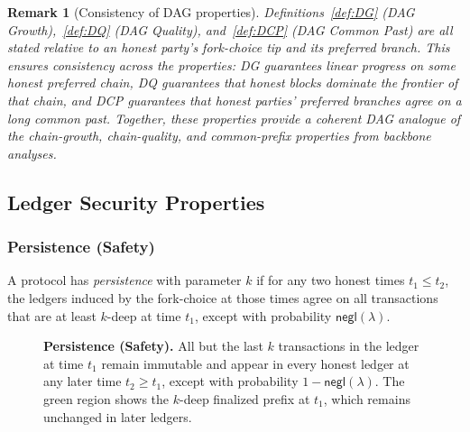 \documentclass[11pt]{article}
\newtheorem{remark}[theorem]{Remark}
\newcommand{\negl}{\ensuremath{\mathsf{negl}}\xspace}
\begin{document}
\begin{remark}[Consistency of DAG properties]
Definitions~\ref{def:DG} (DAG Growth),~\ref{def:DQ} (DAG Quality), and~\ref{def:DCP} (DAG Common Past) are all stated relative to an honest party’s fork-choice tip and its preferred branch. This ensures consistency across the properties: \emph{DG} guarantees linear progress on some honest preferred chain, \emph{DQ} guarantees that honest blocks dominate the frontier of that chain, and \emph{DCP} guarantees that honest parties’ preferred branches agree on a long common past. Together, these properties provide a coherent DAG analogue of the chain-growth, chain-quality, and common-prefix properties from backbone analyses.
\end{remark}



\newpage
\subsection{Ledger Security Properties}

\subsubsection{Persistence (Safety)}
A protocol has \emph{persistence} with parameter $k$ if for any two honest times $t_1\le t_2$,
the ledgers induced by the fork-choice at those times agree on all transactions that are at least $k$-deep at time $t_1$,
except with probability $\negl(\lambda)$.


\begin{figure}[htp!]
\centering
{}
\caption{\textbf{Persistence (Safety).}
\small
All but the last $k$ transactions in the ledger at time $t_1$ remain immutable and appear in every honest ledger at any later time $t_2\ge t_1$, except with probability $1-\negl(\lambda)$.
The green region shows the $k$-deep finalized prefix at $t_1$, which remains unchanged in later ledgers.}

\label{fig:persistence}
\end{figure}
\end{document}
